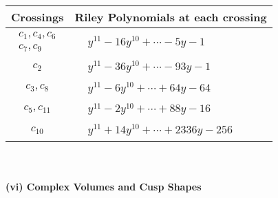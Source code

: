 \documentclass[1p]{elsarticle_modified}
\theoremstyle{definition}
\begin{document}
\begin{tabular}{m{50pt}|m{274pt}}
Crossings & \hspace{64pt}Riley Polynomials at each crossing \\
\hline $$\begin{aligned}c_{1},c_{4},c_{6}\\c_{7},c_{9}\end{aligned}$$&$\begin{aligned}
&y^{11}-16 y^{10}+\cdots-5 y-1
\end{aligned}$\\
\hline $$\begin{aligned}c_{2}\end{aligned}$$&$\begin{aligned}
&y^{11}-36 y^{10}+\cdots-93 y-1
\end{aligned}$\\
\hline $$\begin{aligned}c_{3},c_{8}\end{aligned}$$&$\begin{aligned}
&y^{11}-6 y^{10}+\cdots+64 y-64
\end{aligned}$\\
\hline $$\begin{aligned}c_{5},c_{11}\end{aligned}$$&$\begin{aligned}
&y^{11}-2 y^{10}+\cdots+88 y-16
\end{aligned}$\\
\hline $$\begin{aligned}c_{10}\end{aligned}$$&$\begin{aligned}
&y^{11}+14 y^{10}+\cdots+2336 y-256
\end{aligned}$\\
\hline
\end{tabular}\\~\\
\newpage\flushleft \textbf{(vi) Complex Volumes and Cusp Shapes}
\end{document}
